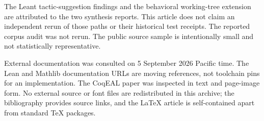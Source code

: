 \documentclass[11pt,a4paper]{article}
\theoremstyle{definition}
\begin{document}
The Leant tactic-suggestion findings and the behavioral working-tree extension
are attributed to the two synthesis reports. This article does not claim an
independent rerun of those paths or their historical test receipts. The reported
corpus audit was not rerun. The public source sample is intentionally small and
not statistically representative.

External documentation was consulted on 5 September 2026 Pacific time. The Lean
and Mathlib documentation URLs are moving references, not toolchain pins for an
implementation. The CoqEAL paper was inspected in text and page-image form.
No external source or font files are redistributed in this archive; the bibliography
provides source links, and the LaTeX article is self-contained apart from standard
TeX packages.

\clearpage
{}
{}
\end{document}

